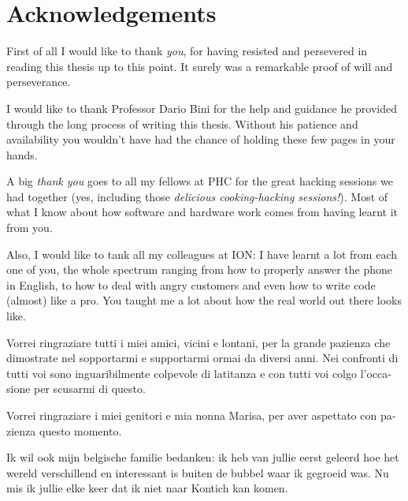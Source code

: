 \chapter{Acknowledgements}
First of all I would like to thank \emph{you}, for having resisted and persevered in reading this thesis up to this point. It surely was a remarkable proof of will and perseverance.

I would like to thank Professor Dario Bini for the help and guidance he provided through the long process of writing this thesis. Without his patience and availability you wouldn't have had the chance of holding these few pages in your hands.

A big \emph{thank you} goes to all my fellows at PHC for the great hacking sessions we had together (yes, including those \emph{delicious cooking-hacking sessions!}). Most of what I know about how software and hardware work comes from having learnt it from you.

Also, I would like to tank all my colleagues at ION: I have learnt a lot from each one of you, the whole spectrum ranging from how to properly answer the phone in English, to how to deal with angry customers and even how to write code (almost) like a pro. You taught me a lot about how the real world out there looks like.

\begin{otherlanguage}{italian}
Vorrei ringraziare tutti i miei amici, vicini e lontani, per la grande pazienza che dimostrate nel sopportarmi e supportarmi ormai da diversi anni. Nei confronti di tutti voi sono inguaribilmente colpevole di latitanza e con tutti voi colgo l'occasione per scusarmi di questo.

Vorrei ringraziare i miei genitori e mia nonna Marisa, per aver aspettato con pazienza questo momento.
\end{otherlanguage}

\begin{otherlanguage}{dutch}
Ik wil ook mijn belgische familie bedanken: ik heb van jullie eerst geleerd hoe het wereld verschillend en interessant is buiten de bubbel waar ik gegroeid was. Nu mis ik jullie elke keer dat ik niet naar Kontich kan komen.
\end{otherlanguage}

